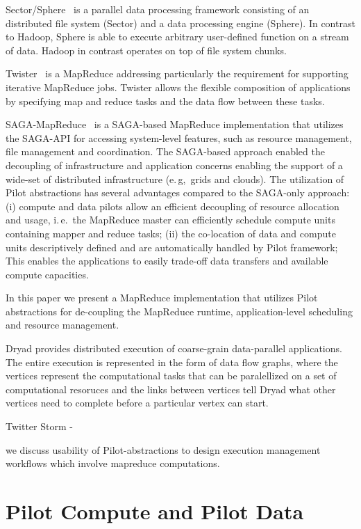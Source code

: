 \documentclass{acm_proc_article-sp}
\newcommand{\pilot}{Pilot\xspace}
\begin{document}
Sector/Sphere~\cite{Gu_Grossman_2009} is a parallel data processing framework
consisting of an distributed file system (Sector) and a data processing engine
(Sphere). In contrast to Hadoop, Sphere is able to execute arbitrary 
user-defined function on a stream of data. Hadoop in contrast operates on top 
of file system chunks.

Twister~\cite{Ekanayake:2010:TRI:1851476.1851593} is a 
MapReduce addressing particularly the requirement for supporting iterative 
MapReduce jobs. Twister allows the flexible composition of applications by 
specifying map and reduce tasks and the data flow between these tasks. 

SAGA-MapReduce~\cite{Sehgal:2011:UAI:1945091.1945329} is a SAGA-based
MapReduce implementation that utilizes the SAGA-API for accessing system-level
features, such as resource management, file management and coordination. The
SAGA-based approach enabled the decoupling of infrastructure and application
concerns enabling the support of a wide-set of distributed infrastructure
(e.\,g,\ grids and clouds). The utilization of Pilot abstractions has several
advantages compared to the SAGA-only approach: (i) compute and data pilots
allow an efficient decoupling of resource allocation and usage, i.\,e.\ the
MapReduce master can efficiently schedule compute units containing mapper and
reduce tasks; (ii) the co-location of data and compute units descriptively
defined and are automatically handled by Pilot framework; This enables the
applications to easily trade-off data transfers and available compute
capacities.

In this paper we present a  MapReduce implementation that utilizes \pilot abstractions for de-coupling the MapReduce runtime, application-level scheduling and resource management.


Dryad provides distributed execution of coarse-grain data-parallel applications. The entire execution is represented in the form of data flow graphs, where the vertices represent the computational tasks that can be paralellized on a set of computational resoruces and the links between vertices tell Dryad what other vertices need to complete before a particular vertex can start.

Twitter Storm -

we discuss usability of \pilot-abstractions to design execution management workflows which involve mapreduce computations. 

\section{Pilot Compute and Pilot Data}
\end{document}
